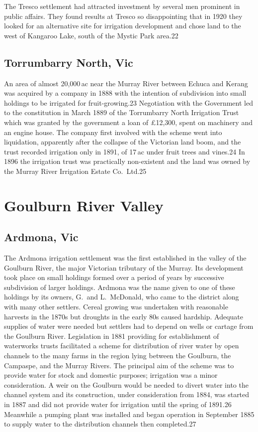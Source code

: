 The Tresco settlement had attracted investment by several men
prominent in public affairs. They found results at Tresco so
disappointing that in 1920 they looked for an alternative site for
irrigation development and chose land to the west of Kangaroo Lake,
south of the Mystic Park area.22

\subsection{Torrumbarry North, Vic}

An area of almost 20,000\,ac near the Murray River between Echuca and
Kerang was acquired by a company in 1888 with the intention of
subdivision into small holdings to be irrigated for fruit-growing.23
Negotiation with the Government led to the constitution in March 1889
of the Torrumbarry North Irrigation Trust which was granted by the
government a loan of \pounds12,300, spent on machinery and an engine
house.  The company first involved with the scheme went into
liquidation, apparently after the collapse of the Victorian land boom,
and the trust recorded irrigation only in 1891, of 17\,ac under fruit
trees and vines.24 In 1896 the irrigation trust was practically
non-existent and the land was owned by the Murray River Irrigation
Estate Co.\ Ltd.25

\section{Goulburn River Valley}

\subsection{Ardmona, Vic}

The Ardmona irrigation settlement was the first established in the
valley of the Goulburn River, the major Victorian tributary of the
Murray.  Its development took place on small holdings formed over a
period of years by successive subdivision of larger holdings.  Ardmona
was the name given to one of these holdings by its owners, G.~and
L.~McDonald, who came to the district along with many other settlers.
Cereal growing was undertaken with reasonable harvests in the 1870s
but droughts in the early 80s caused hardship.  Adequate supplies of
water were needed but settlers had to depend on wells or cartage from
the Goulburn River.  Legislation in 1881 providing for establishment
of waterworks trusts facilitated a scheme for distribution of river
water by open channels to the many farms in the region lying between
the Goulburn, the Campaspe, and the Murray Rivers.  The principal aim
of the scheme was to provide water for stock and domestic purposes;
irrigation was a minor consideration.  A weir on the Goulburn would be
needed to divert water into the channel system and its construction,
under consideration from 1884, was started in 1887 and did not provide
water for irrigation until the spring of 1891.26 Meanwhile a pumping
plant was installed and began operation in September 1885 to supply
water to the distribution channels then completed.27

